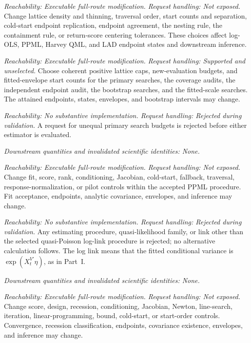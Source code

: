 \documentclass[11pt]{article}
\begin{document}
\begin{description}[style=nextline]
\item[Shared conditional-scale search controls.]
\emph{Reachability: Executable full-route modification. Request handling: Not exposed.}
Change lattice density and thinning, traversal order, start counts and separation, cold-start endpoint replication,
endpoint agreement, the nesting rule, the containment rule, or return-score centering tolerances. These choices
affect log-OLS, PPML, Harvey QML, and LAD endpoint states and downstream inference.

\item[Conditional-scale search budgets.]
\emph{Reachability: Executable full-route modification. Request handling: Supported and unselected.}
Choose coherent positive lattice caps, new-evaluation budgets, and fitted-envelope start counts for the
primary searches, the coverage audits, the independent endpoint audit, the bootstrap searches, and
the fitted-scale searches. The attained endpoints,
states, envelopes, and bootstrap intervals may change.

\item[Unequal PPML and Harvey QML budgets.]
\emph{Reachability: No substantive implementation. Request handling: Rejected during validation.}
A request for unequal primary search budgets is rejected before either estimator is evaluated.

\emph{Downstream quantities and invalidated scientific identities: None.}

\item[PPML numerical controls.]
\emph{Reachability: Executable full-route modification. Request handling: Not exposed.}
Change fit, score, rank, conditioning, Jacobian, cold-start, fallback, traversal, response-normalization,
or pilot controls within the accepted PPML procedure. Fit acceptance, endpoints,
analytic covariance, envelopes, and inference may change.

\item[Alternative PPML fit or mean-link family.]
\emph{Reachability: No substantive implementation. Request handling: Rejected during validation.}
Any estimating procedure, quasi-likelihood family, or link other than the selected quasi-Poisson
log-link procedure is rejected; no alternative calculation follows. The log link means that the
fitted conditional variance is \(\exp(X_t^{V\prime}\eta)\), as in Part~I.

\emph{Downstream quantities and invalidated scientific identities: None.}

\item[Harvey QML numerical controls.]
\emph{Reachability: Executable full-route modification. Request handling: Not exposed.}
Change score, design, recession, conditioning, Jacobian, Newton, line-search, iteration, linear-programming,
bound, cold-start, or start-order controls. Convergence, recession classification,
endpoints, covariance existence, envelopes, and inference may change.


\end{description}
\end{document}
